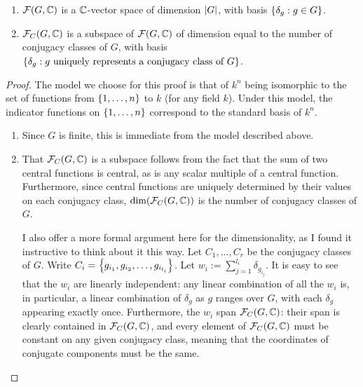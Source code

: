 \begin{proposition}\label{Ch2:Prop:FGC_FcGC_Fin_Dim} \hfill
    \begin{enumerate}[label = \normalfont \arabic*., noitemsep]
        \item $\mathcal{F}\!\left( G, \mathbb{C} \right)$ is a $\mathbb{C}$-vector space of dimension $\left\lvert G \right\rvert$, with basis $\left\{ \delta_g : g \in G \right\}$.
        \item $\mathcal{F}_C\!\left( G, \mathbb{C} \right)$ is a subspace of $\mathcal{F}\!\left( G, \mathbb{C} \right)$ of dimension equal to the number of conjugacy classes of $G$, with basis $\left\{ \delta_g : g \text{ uniquely represents a conjugacy class of $G$} \right\}$.
    \end{enumerate}
\end{proposition}
\begin{proof}
    The model we choose for this proof is that of $k^n$ being isomorphic to the set of functions from $\left\{ 1, \ldots, n \right\}$ to $k$ (for any field $k$). Under this model, the indicator functions on $\left\{ 1, \ldots, n \right\}$ correspond to the standard basis of $k^n$. %
    \begin{enumerate}
        \item Since $G$ is finite, this is immediate from the model described above.
        \item That $\mathcal{F}_C\!\left( G, \mathbb{C} \right)$ is a subspace follows from the fact that the sum of two central functions is central, as is any scalar multiple of a central function. Furthermore, since central functions are uniquely determined by their values on each conjugacy class, $\dim\!\left( \mathcal{F}_C\!\left( G, \mathbb{C} \right) \right)$ is the number of conjugacy classes of $G$.
        
        I also offer a more formal argument here for the dimensionality, as I found it instructive to think about it this way. Let $C_1, \ldots, C_r$ be the conjugacy classes of $G$. Write $C_i = \left\{ g_{i_1}, g_{i_2}, \ldots, g_{i_{l_i}} \right\}$. Let $w_i := \sum_{j=1}^{l_i} \delta_{g_{i_j}}$. It is easy to see that the $w_i$ are linearly independent: any linear combination of all the $w_i$ is, in particular, a linear combination of $\delta_{g}$ as $g$ ranges over $G$, with each $\delta_g$ appearing exactly once. Furthermore, the $w_i$ span $\mathcal{F}_C\!\left( G, \mathbb{C} \right)$: their span is clearly contained in $\mathcal{F}_C\!\left( G, \mathbb{C} \right)$, and every element of $\mathcal{F}_C\!\left( G, \mathbb{C} \right)$ must be constant on any given conjugacy class, meaning that the coordinates of conjugate components must be the same.
    \end{enumerate}
\end{proof}

